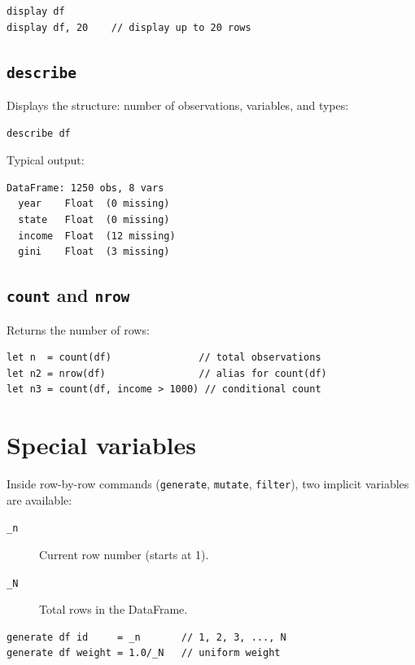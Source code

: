 \begin{lstlisting}
display df
display df, 20    // display up to 20 rows
\end{lstlisting}

\subsection*{\texttt{describe}}

Displays the structure: number of observations, variables, and types:

\begin{lstlisting}
describe df
\end{lstlisting}

Typical output:

\begin{lstlisting}[style=inline]
DataFrame: 1250 obs, 8 vars
  year    Float  (0 missing)
  state   Float  (0 missing)
  income  Float  (12 missing)
  gini    Float  (3 missing)
\end{lstlisting}

\subsection*{\texttt{count} and \texttt{nrow}}

Returns the number of rows:

\begin{lstlisting}
let n  = count(df)               // total observations
let n2 = nrow(df)                // alias for count(df)
let n3 = count(df, income > 1000) // conditional count
\end{lstlisting}

\section{Special variables}

Inside row-by-row commands (\lstinline{generate}, \lstinline{mutate},
\lstinline{filter}), two implicit variables are available:

\begin{description}
  \item[\lstinline{_n}] Current row number (starts at 1).
  \item[\lstinline{_N}] Total rows in the DataFrame.
\end{description}

\begin{lstlisting}
generate df id     = _n       // 1, 2, 3, ..., N
generate df weight = 1.0/_N   // uniform weight
\end{lstlisting}


